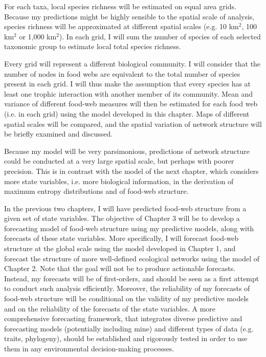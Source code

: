 For each taxa, local species richness will be estimated on equal area grids.
Because my predictions might be highly sensible to the spatial scale of
analysis, species richness will be approximated at different spatial scales
(e.g. 10 km$^2$, 100 km$^2$ or 1,000 km$^2$). In each grid, I will sum the
number of species of each selected taxonomic group to estimate local total
species richness.

Every grid will represent a different biological community. I will consider that
the number of nodes in food webs are equivalent to the total number of species
present in each grid. I will thus make the assumption that every species has at
least one trophic interaction with another member of its community. Mean and
variance of different food-web measures will then be estimated for each food web
(i.e. in each grid) using the model developed in this chapter. Maps of different
spatial scales will be compared, and the spatial variation of network structure
will be briefly examined and discussed.

Because my model will be very parsimonious, predictions of network structure
could be conducted at a very large spatial scale, but perhaps with poorer
precision. This is in contrast with the model of the next chapter, which
considers more state variables, i.e. more biological information, in the
derivation of maximum entropy distributions and of food-web structure.

In the previous two chapters, I will have predicted food-web structure from a
given set of state variables. The objective of Chapter 3 will be to develop a
forecasting model of food-web structure using my predictive models, along with
forecasts of these state variables. More specifically, I will forecast food-web
structure at the global scale using the model developed in Chapter 1, and
forecast the structure of more well-defined ecological networks using the model
of Chapter 2. Note that the goal will not be to produce actionable forecasts.
Instead, my forecasts will be of first-orders, and should be seen as a first
attempt to conduct such analysis efficiently. Moreover, the reliability of my
forecasts of food-web structure will be conditional on the validity of my
predictive models and on the reliability of the forecasts of the state
variables. A more comprehensive forecasting framework, that integrates diverse
predictive and forecasting models (potentially including mine) and different
types of data (e.g. traits, phylogeny), should be established and rigorously
tested in order to use them in any environmental decision-making processes.

